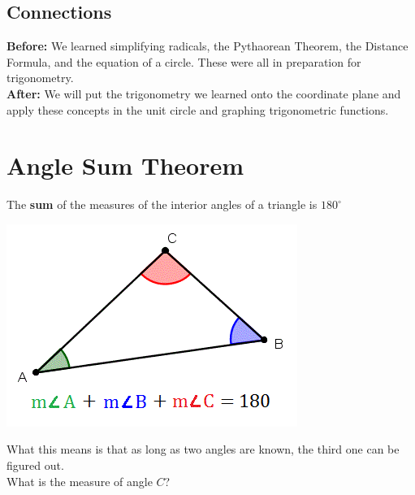 \documentclass[12pt]{article}
\begin{document}
\subsection*{Connections}

\textbf{Before:} We learned simplifying radicals, the Pythaorean Theorem, the Distance Formula, and the equation of a circle. These were all in preparation for trigonometry.\\

\textbf{After:} We will put the trigonometry we learned onto the coordinate plane and apply these concepts in the unit circle and graphing trigonometric functions.\

\let\stdsection\section
\renewcommand\section{\newpage\stdsection}

\section*{Angle Sum Theorem}

The \textbf{sum} of the measures of the interior angles of a triangle is $180^{\circ}$\\

\begin{center}
\includegraphics[scale=.5]{triangle2.png}\\
\end{center}

What this means is that as long as two angles are known, the third one can be figured out.\\

What is the measure of angle $C$?\\
\end{document}
